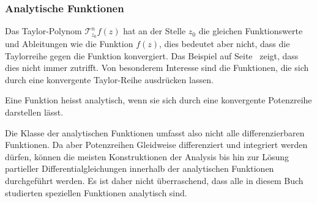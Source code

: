\subsubsection{Analytische Funktionen}
Das Taylor-Polynom $\mathscr{T}_{z_0}^nf(z)$ hat an der Stelle $z_0$
die gleichen Funktionswerte und Ableitungen wie die Funktion $f(z)$,
dies bedeutet aber nicht, dass die Taylorreihe gegen die Funktion 
konvergiert.
Das Beispiel auf
Seite~\pageref{buch:funktionentheorie:beispiel:nichtanalytisch}
zeigt, dass dies nicht immer zutrifft.
Von besonderem Interesse sind die Funktionen, die sich durch eine
konvergente Taylor-Reihe ausdrücken lassen.

\begin{definition}
\label{buch:polynome:def:analytisch}
%
Eine Funktion heisst analytisch, wenn sie sich durch eine
konvergente Potenzreihe darstellen lässt.
\end{definition}

Die Klasse der analytischen Funktionen umfasst also nicht alle 
differenzierbaren Funktionen.
Da aber Potenzreihen Gleidweise differenziert und integriert werden
dürfen, können die meisten Konstruktionen der Analysis bis hin zur
Lösung partieller Differentialgleichungen innerhalb der analytischen
Funktionen durchgeführt werden.
Es ist daher nicht überraschend, dass alle in diesem Buch studierten
speziellen Funktionen analytisch sind.


